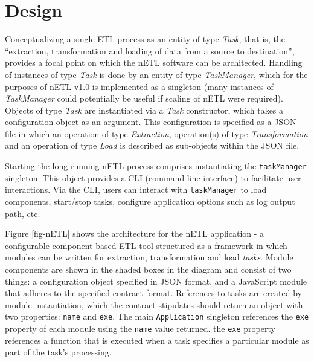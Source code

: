 \section{Design}
Conceptualizing a single ETL process as an entity of type \textit{Task}, that is, the ``extraction, transformation and loading of data from a source to destination'', provides a focal point on which the nETL software can be architected. Handling of instances of type \textit{Task} is done by an entity of type \textit{TaskManager}, which for the purposes of nETL v1.0 is implemented as a singleton (many instances of \textit{TaskManager} could potentially be useful if scaling of nETL were required). Objects of type \textit{Task} are instantiated via a \textit{Task} constructor, which takes a configuration object as an argument. This configuration is specified as a JSON file in which an operation of type \textit{Extraction}, operation(s) of type \textit{Transformation} and an operation of type \textit{Load} is described as sub-objects within the JSON file.

Starting the long-running nETL process comprises instantiating the \texttt{taskManager} singleton. This object provides a CLI (command line interface) to facilitate user interactions. Via the CLI, users can interact with \texttt{taskManager} to load components, start/stop tasks, configure application options such as log output path, etc.



Figure \ref{fig-nETL} shows the architecture for the nETL application - a configurable component-based ETL tool structured as a framework in which modules can be written for extraction, transformation and load \textit{tasks}. Module components are shown in the shaded boxes in the diagram and consist of two things: a configuration object specified in JSON format, and a JavaScript module that adheres to the specified contract format. References to tasks are created by module instantiation, which the contract stipulates should return an object with two properties: \texttt{name} and \texttt{exe}. The main \texttt{Application} singleton references the \texttt{exe} property of each module using the \texttt{name} value returned. the \texttt{exe} property references a function that is executed when a task specifies a particular module as part of the task's processing.

